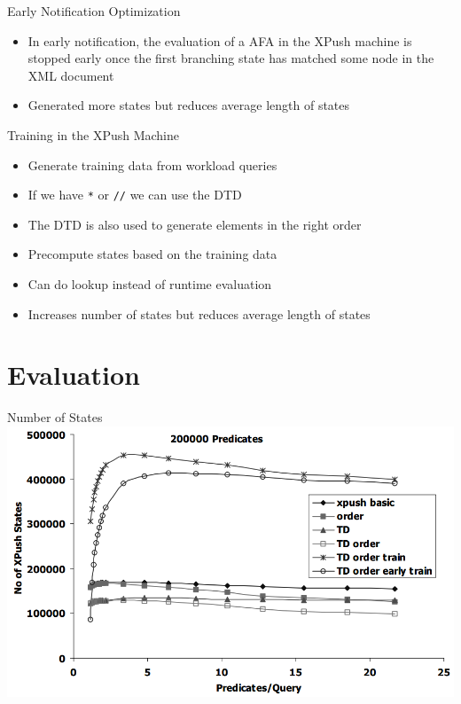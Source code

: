\documentclass[mathserif,serif]{beamer}
\begin{document}
\begin{frame}{Early Notification Optimization}
  \begin{itemize}
    \item In early notification, the evaluation of a AFA in the XPush machine is stopped early once the first branching state has matched some node in the XML document
    \item Generated more states but reduces average length of states
  \end{itemize}
\end{frame}

\begin{frame}{Training in the XPush Machine}
  \begin{itemize}
    \item Generate training data from workload queries
    \item If we have \texttt{*} or \texttt{//} we can use the DTD
    \item The DTD is also used to generate elements in the right order
    \item Precompute states based on the training data
    \item Can do lookup instead of runtime evaluation 
    \item Increases number of states but reduces average length of states
  \end{itemize}
\end{frame}

\section{Evaluation}
\begin{frame}{Number of States}
  \includegraphics[width=\textwidth]{states}
\end{frame}
\end{document}
